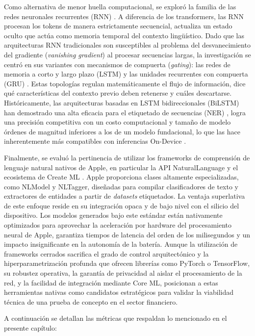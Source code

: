 Como alternativa de menor huella computacional, se exploró la familia de las redes neuronales recurrentes (RNN) \citep{elman1990finding}. A diferencia de los transformers, las RNN procesan los tokens de manera estrictamente secuencial, actualiza un estado oculto que actúa como memoria temporal del contexto lingüístico. Dado que las arquitecturas RNN tradicionales son susceptibles al problema del desvanecimiento del gradiente (\textit{vanishing gradient}) al procesar secuencias largas, la investigación se centró en sus variantes con mecanismos de compuerta (\textit{gating}): las redes de memoria a corto y largo plazo (LSTM) \citep{hochreiter1997long} y las unidades recurrentes con compuerta (GRU) \citep{cho2014learning}. Estas topologías regulan matemáticamente el flujo de información, dice qué características del contexto previo deben retenerse y cuáles descartarse. Históricamente, las arquitecturas basadas en LSTM bidireccionales (BiLSTM) \citep{huang2015bidirectional} han demostrado una alta eficacia para el etiquetado de secuencias (NER) \citep{lample2016neural}, logra una precisión competitiva con un costo computacional y tamaño de modelo órdenes de magnitud inferiores a los de un modelo fundacional, lo que las hace inherentemente más compatibles con inferencias On-Device \citep{dhar2021survey}.

Finalmente, se evaluó la pertinencia de utilizar los frameworks de comprensión de lenguaje natural nativos de Apple, en particular la API NaturalLanguage y el ecosistema de Create ML \citep{apple2025naturallanguage}. Apple proporciona clases altamente especializadas, como NLModel y NLTagger, diseñadas para compilar clasificadores de texto y extractores de entidades a partir de \textit{datasets} etiquetados. La ventaja superlativa de este enfoque reside en su integración opaca y de bajo nivel con el silicio del dispositivo. Los modelos generados bajo este estándar están nativamente optimizados para aprovechar la aceleración por hardware del procesamiento neural de Apple, garantiza tiempos de latencia del orden de los milisegundos y un impacto insignificante en la autonomía de la batería. Aunque la utilización de frameworks cerrados sacrifica el grado de control arquitectónico y la hiperparametrización profunda que ofrecen librerías como PyTorch o TensorFlow, su robustez operativa, la garantía de privacidad al aislar el procesamiento de la red, y la facilidad de integración mediante Core ML, posicionan a estas herramientas nativas como candidatos estratégicos para validar la viabilidad técnica de una prueba de concepto en el sector financiero.

A continuación se detallan las métricas que respaldan lo mencionado en el presente capítulo:



